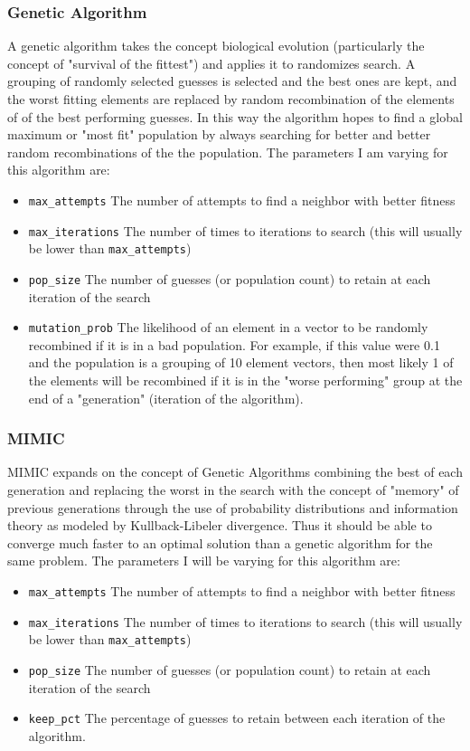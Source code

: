 \documentclass[11pt]{article}
\begin{document}
    \subsubsection*{Genetic Algorithm}
    A genetic algorithm takes the concept biological evolution (particularly the concept of "survival of the fittest") and applies it to randomizes search.
    A grouping of randomly selected guesses is selected and the best ones are kept, and the worst fitting elements are replaced by random recombination of the
    elements of of the best performing guesses.
    In this way the algorithm hopes to find a global maximum or "most fit" population by always searching for better and better random recombinations of the the population.
    The parameters I am varying for this algorithm are:
    \begin{itemize}
        \item \texttt{max\_attempts} The number of attempts to find a neighbor with better fitness
        \item \texttt{max\_iterations} The number of times to iterations to search (this will usually be lower than \texttt{max\_attempts})
        \item \texttt{pop\_size} The number of guesses (or population count) to retain at each iteration of the search
        \item \texttt{mutation\_prob} The likelihood of an element in a vector to be randomly recombined if it is in a bad population.
        For example, if this value were 0.1 and the population is a grouping of 10 element vectors, then most likely 1 of the elements will be recombined
        if it is in the "worse performing" group at the end of a "generation" (iteration of the algorithm).
    \end{itemize}
    \subsubsection*{MIMIC}
    MIMIC expands on the concept of Genetic Algorithms combining the best of each generation and replacing the worst in the
    search with the concept of "memory" of previous generations through the use of probability distributions and information theory as
    modeled by Kullback-Libeler divergence.\cite{Isbell97} Thus it should be able to converge much faster to an optimal solution
    than a genetic algorithm for the same problem.
    The parameters I will be varying for this algorithm are:
     \begin{itemize}
        \item \texttt{max\_attempts} The number of attempts to find a neighbor with better fitness
        \item \texttt{max\_iterations} The number of times to iterations to search (this will usually be lower than \texttt{max\_attempts})
        \item \texttt{pop\_size} The number of guesses (or population count) to retain at each iteration of the search
        \item \texttt{keep\_pct} The percentage of guesses to retain between each iteration of the algorithm.
    \end{itemize}
\end{document}
